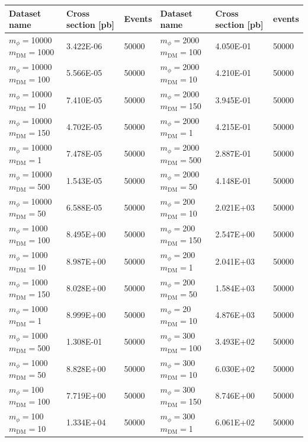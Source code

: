 \begin{table}[]
\centering
\small
\begin{tabular}{lll||lll}
\hline
Dataset name        & Cross section [pb]  & Events    & Dataset name  & Cross section [pb]  & events           \\\hline
$m_\phi=$10000 $m_\textrm{DM}=$1000  & 3.422E-06 & 50000 & $m_\phi=$2000 $m_\textrm{DM}=$100    & 4.050E-01 & 50000 \\
$m_\phi=$10000 $m_\textrm{DM}=$100   & 5.566E-05 & 50000 & $m_\phi=$2000 $m_\textrm{DM}=$10     & 4.210E-01 & 50000 \\
$m_\phi=$10000 $m_\textrm{DM}=$10    & 7.410E-05 & 50000 & $m_\phi=$2000 $m_\textrm{DM}=$150    & 3.945E-01 & 50000 \\
$m_\phi=$10000 $m_\textrm{DM}=$150   & 4.702E-05 & 50000 & $m_\phi=$2000 $m_\textrm{DM}=$1      & 4.215E-01 & 50000 \\
$m_\phi=$10000 $m_\textrm{DM}=$1     & 7.478E-05 & 50000 & $m_\phi=$2000 $m_\textrm{DM}=$500    & 2.887E-01 & 50000 \\
$m_\phi=$10000 $m_\textrm{DM}=$500   & 1.543E-05 & 50000 & $m_\phi=$2000 $m_\textrm{DM}=$50     & 4.148E-01 & 50000 \\
$m_\phi=$10000 $m_\textrm{DM}=$50    & 6.588E-05 & 50000 & $m_\phi=$200 $m_\textrm{DM}=$10      & 2.021E+03 & 50000 \\
$m_\phi=$1000 $m_\textrm{DM}=$100    & 8.495E+00 & 50000 & $m_\phi=$200 $m_\textrm{DM}=$150     & 2.547E+00 & 50000 \\
$m_\phi=$1000 $m_\textrm{DM}=$10     & 8.987E+00 & 50000 & $m_\phi=$200 $m_\textrm{DM}=$1       & 2.041E+03 & 50000 \\
$m_\phi=$1000 $m_\textrm{DM}=$150    & 8.028E+00 & 50000 & $m_\phi=$200 $m_\textrm{DM}=$50      & 1.584E+03 & 50000 \\
$m_\phi=$1000 $m_\textrm{DM}=$1      & 8.999E+00 & 50000 & $m_\phi=$20 $m_\textrm{DM}=$10       & 4.876E+03 & 50000 \\
$m_\phi=$1000 $m_\textrm{DM}=$500    & 1.308E-01 & 50000 & $m_\phi=$300 $m_\textrm{DM}=$100     & 3.493E+02 & 50000 \\
$m_\phi=$1000 $m_\textrm{DM}=$50     & 8.828E+00 & 50000 & $m_\phi=$300 $m_\textrm{DM}=$10      & 6.030E+02 & 50000 \\
$m_\phi=$100 $m_\textrm{DM}=$100     & 7.719E+00 & 50000 & $m_\phi=$300 $m_\textrm{DM}=$150     & 8.746E+00 & 50000 \\
$m_\phi=$100 $m_\textrm{DM}=$10      & 1.334E+04 & 50000 & $m_\phi=$300 $m_\textrm{DM}=$1       & 6.061E+02 & 50000 \\

\end{tabular}
\end{table}
